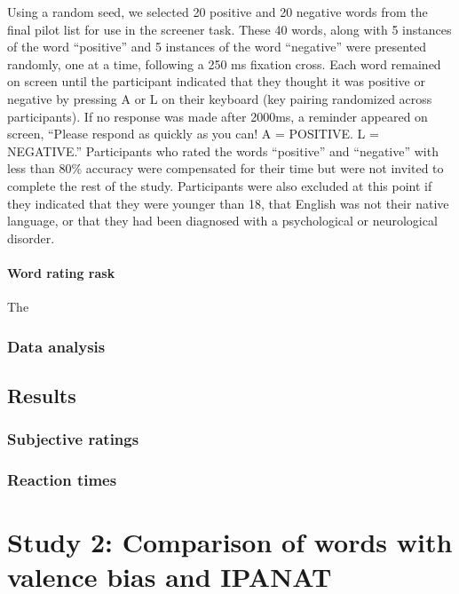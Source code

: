 \documentclass[man]{apa6}
\let\oldparagraph\paragraph
\renewcommand{\paragraph}[1]{\oldparagraph{#1}\mbox{}}
\begin{document}
Using a random seed, we selected 20 positive and 20 negative words from the final pilot list for use in the screener task. These 40 words, along with 5 instances of the word \enquote{positive} and 5 instances of the word \enquote{negative} were presented randomly, one at a time, following a 250 ms fixation cross. Each word remained on screen until the participant indicated that they thought it was positive or negative by pressing A or L on their keyboard (key pairing randomized across participants). If no response was made after 2000ms, a reminder appeared on screen, \enquote{Please respond as quickly as you can! A = POSITIVE. L = NEGATIVE.} Participants who rated the words \enquote{positive} and \enquote{negative} with less than 80\% accuracy were compensated for their time but were not invited to complete the rest of the study. Participants were also excluded at this point if they indicated that they were younger than 18, that English was not their native language, or that they had been diagnosed with a psychological or neurological disorder.

\hypertarget{word-rating-rask}{%
\paragraph{Word rating rask}\label{word-rating-rask}}

The

\hypertarget{data-analysis}{%
\subsubsection{Data analysis}\label{data-analysis}}

\hypertarget{results}{%
\subsection{Results}\label{results}}

\hypertarget{subjective-ratings}{%
\subsubsection{Subjective ratings}\label{subjective-ratings}}

\hypertarget{reaction-times}{%
\subsubsection{Reaction times}\label{reaction-times}}

\hypertarget{study-2-comparison-of-words-with-valence-bias-and-ipanat}{%
\section{Study 2: Comparison of words with valence bias and IPANAT}\label{study-2-comparison-of-words-with-valence-bias-and-ipanat}}
\end{document}
